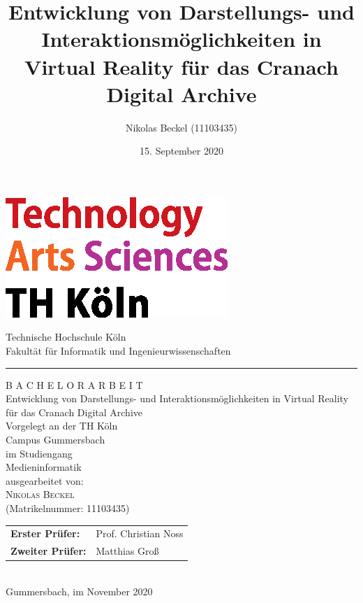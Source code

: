 \documentclass[a4paper,12pt,oneside]{article}
\title{Entwicklung von Darstellungs- und Interaktionsmöglichkeiten in Virtual Reality für das Cranach Digital Archive}
\author{Nikolas Beckel (11103435)}
\date{15. September 2020}
\begin{document}
  \pagestyle{empty} %
  \newpage %

  \newpage

  \pagestyle{empty}
  \begin{titlepage}
    \includegraphics[scale=1.00]{img/logo_TH-Koeln_CMYK_22pt}\\
    \begin{center}
      \Large
      Technische Hochschule Köln\\
      Fakultät für Informatik und Ingenieurwissenschaften\\
      \hrule\par\rule{0pt}{2cm} %
      \LARGE
      \textsc{B A C H E L O R A R B E I T}\\
      \vspace{1cm} %
      \huge
      Entwicklung von Darstellungs- und Interaktionsmöglichkeiten in Virtual Reality für das Cranach Digital Archive\\
      \vspace{1cm}
      \large
      Vorgelegt an der TH Köln\\
      Campus Gummersbach\\
      im Studiengang\\
      Medieninformatik\\ 
      \vspace{1.0cm}
      ausgearbeitet von:\\
      \textsc{Nikolas Beckel}\\
      (Matrikelnummer: 11103435)\\
      \vspace{1.5cm}
      \begin{tabular}{ll} %
          \textbf{Erster Prüfer:} & Prof. Christian Noss \\
          \textbf{Zweiter Prüfer:} & Matthias Groß \\
      \end{tabular}
      \vspace{1.5cm}
      \\Gummersbach, im November 2020
    \end{center}    
  \end{titlepage}
\end{document}
